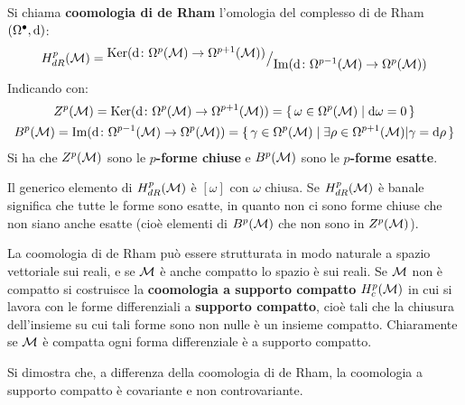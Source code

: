 \begin{definition}
  Si chiama \textbf{coomologia di de Rham}
  l'omologia del complesso di de Rham $ (\Omega^\bullet, \operatorname{d}\!{}) $:
  \[
    H^p_{dR}(\mathcal{M}) = {^{\textstyle \mathrm{Ker}(  \operatorname{d}\!{} \colon \Omega^p(\mathcal{M}) \to \Omega^{p+1}(\mathcal{M}))}\big/_{\textstyle \mathrm{Im}( \operatorname{d}\!{} \colon \Omega^{p-1}(\mathcal{M}) \to \Omega^p(\mathcal{M}) )}}
  \]
  Indicando con:
  \begin{gather*}
    Z^p(\mathcal{M}) = \mathrm{Ker}(  \operatorname{d}\!{} \colon \Omega^p(\mathcal{M}) \to \Omega^{p+1}(\mathcal{M})) = \set{\omega \in \Omega^p(\mathcal{M}) | \ensuremath{\operatorname{d}\!{\omega}} = 0} \\
    B^p(\mathcal{M}) = \mathrm{Im}( \operatorname{d}\!{} \colon \Omega^{p-1}(\mathcal{M}) \to \Omega^p(\mathcal{M}) ) = \set{\gamma \in \Omega^p(\mathcal{M}) | \exists \rho \in \Omega^{p+1}(\mathcal{M}) | \gamma = \ensuremath{\operatorname{d}\!{\rho}}}
  \end{gather*}
  Si ha che $ Z^p(\mathcal{M}) $ sono le  \textbf{$ p $-forme chiuse} e $ B^p(\mathcal{M}) $ sono
  le \textbf{ $ p $-forme esatte}.
\end{definition}
Il generico elemento di $ H^p_{dR}(\mathcal{M}) $ è $ [\omega] $ con $ \omega $ chiusa. Se
$ H^p_{dR}(\mathcal{M}) $ è banale significa che tutte le forme sono esatte, in quanto
non ci sono forme chiuse che non siano anche esatte (cioè elementi di
$ B^p(\mathcal{M}) $ che non sono in $ Z^p(\mathcal{M}) $).
\begin{osservation}
  La coomologia di de Rham può essere strutturata in modo naturale a spazio
  vettoriale sui reali, e se $ \mathcal{M} $ è anche compatto lo spazio è sui reali. Se
  $ \mathcal{M} $ non è compatto si costruisce la \textbf{coomologia a supporto
    compatto} $ H^p_c(\mathcal{M}) $ in cui si
  lavora con le forme differenziali a \textbf{supporto compatto}, cioè tali che la chiusura dell'insieme su cui tali forme sono non
  nulle è un insieme compatto. Chiaramente se $ \mathcal{M} $ è compatta ogni forma
  differenziale è a supporto compatto.
\end{osservation}
\begin{lemma}
  Si dimostra che, a differenza della coomologia di de Rham, la coomologia a supporto
  compatto è covariante e non controvariante.
\end{lemma}

